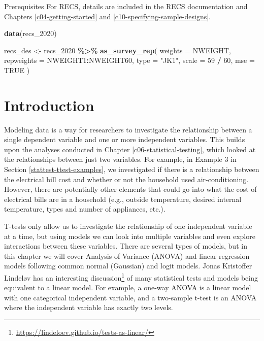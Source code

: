 \documentclass[
]{krantz}
\makeatletter
\newenvironment{Shaded}{\begin{snugshade}}{\end{snugshade}}
\newcommand{\AttributeTok}[1]{\textcolor[rgb]{0.27,0.27,0.27}{#1}}
\newcommand{\ConstantTok}[1]{\textcolor[rgb]{0.37,0.37,0.37}{#1}}
\newcommand{\DecValTok}[1]{\textcolor[rgb]{0.06,0.06,0.06}{#1}}
\newcommand{\FunctionTok}[1]{\textcolor[rgb]{0.27,0.27,0.27}{\textbf{#1}}}
\newcommand{\NormalTok}[1]{#1}
\newcommand{\OtherTok}[1]{\textcolor[rgb]{0.37,0.37,0.37}{#1}}
\newcommand{\SpecialCharTok}[1]{\textcolor[rgb]{0.43,0.43,0.43}{\textbf{#1}}}
\newcommand{\StringTok}[1]{\textcolor[rgb]{0.5,0.5,0.5}{#1}}
\renewcommand{\href}[2]{#2\footnote{\url{#1}}}
\newenvironment{kframe}{%
\medskip{}
\setlength{\fboxsep}{.8em}
 \def\at@end@of@kframe{}%
 \ifinner\ifhmode%
  \def\at@end@of@kframe{\end{minipage}}%
  \begin{minipage}{\columnwidth}%
 \fi\fi%
 \def\FrameCommand##1{\hskip\@totalleftmargin \hskip-\fboxsep
 \colorbox{shadecolor}{##1}\hskip-\fboxsep
     \hskip-\linewidth \hskip-\@totalleftmargin \hskip\columnwidth}%
 \MakeFramed {\advance\hsize-\width
   \@totalleftmargin\z@ \linewidth\hsize
   \@setminipage}}%
 {\par\unskip\endMakeFramed%
 \at@end@of@kframe}
\renewenvironment{Shaded}{\begin{kframe}}{\end{kframe}}
\makeatother
\begin{document}
\begin{prereqbox}{Prerequisites}
For RECS, details are included in the RECS documentation and Chapters \ref{c04-getting-started} and \ref{c10-specifying-sample-designs}.

\begin{Shaded}
\begin{Highlighting}[]
\FunctionTok{data}\NormalTok{(recs\_2020)}

\NormalTok{recs\_des }\OtherTok{\textless{}{-}}\NormalTok{ recs\_2020 }\SpecialCharTok{\%\textgreater{}\%}
  \FunctionTok{as\_survey\_rep}\NormalTok{(}
    \AttributeTok{weights =}\NormalTok{ NWEIGHT,}
    \AttributeTok{repweights =}\NormalTok{ NWEIGHT1}\SpecialCharTok{:}\NormalTok{NWEIGHT60,}
    \AttributeTok{type =} \StringTok{"JK1"}\NormalTok{,}
    \AttributeTok{scale =} \DecValTok{59} \SpecialCharTok{/} \DecValTok{60}\NormalTok{,}
    \AttributeTok{mse =} \ConstantTok{TRUE}
\NormalTok{  )}
\end{Highlighting}
\end{Shaded}

\end{prereqbox}

\hypertarget{model-intro}{%
\section{Introduction}\label{model-intro}}

Modeling data is a way for researchers to investigate the relationship between a single dependent variable and one or more independent variables. This builds upon the analyses conducted in Chapter \ref{c06-statistical-testing}, which looked at the relationships between just two variables. For example, in Example 3 in Section \ref{stattest-ttest-examples}, we investigated if there is a relationship between the electrical bill cost and whether or not the household used air-conditioning. However, there are potentially other elements that could go into what the cost of electrical bills are in a household (e.g., outside temperature, desired internal temperature, types and number of appliances, etc.).

T-tests only allow us to investigate the relationship of one independent variable at a time, but using models we can look into multiple variables and even explore interactions between these variables. There are several types of models, but in this chapter we will cover Analysis of Variance (ANOVA) and linear regression models following common normal (Gaussian) and logit models. Jonas Kristoffer Lindeløv has an interesting \href{https://lindeloev.github.io/tests-as-linear/}{discussion} of many statistical tests and models being equivalent to a linear model. For example, a one-way ANOVA is a linear model with one categorical independent variable, and a two-sample t-test is an ANOVA where the independent variable has exactly two levels.
\end{document}
